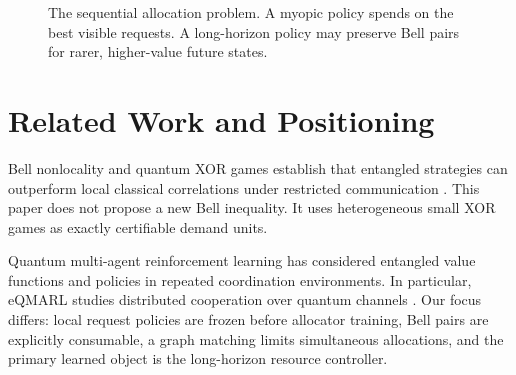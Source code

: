 \documentclass[10pt,twocolumn]{article}
\begin{document}
\begin{figure}[t]
\centering
{}
\caption{The sequential allocation problem. A myopic policy spends on the best visible requests. A long-horizon policy may preserve Bell pairs for rarer, higher-value future states.}
\label{fig:timeline}
\end{figure}

\section{Related Work and Positioning}
Bell nonlocality and quantum XOR games establish that entangled strategies can outperform local classical correlations under restricted communication \cite{bell1964einstein,clauser1969proposed,tsirelson1980quantum,cleve2004consequences}. This paper does not propose a new Bell inequality. It uses heterogeneous small XOR games as exactly certifiable demand units.

Quantum multi-agent reinforcement learning has considered entangled value functions and policies in repeated coordination environments. In particular, eQMARL studies distributed cooperation over quantum channels \cite{derieux2025eqmarl}. Our focus differs: local request policies are frozen before allocator training, Bell pairs are explicitly consumable, a graph matching limits simultaneous allocations, and the primary learned object is the long-horizon resource controller.
\end{document}
